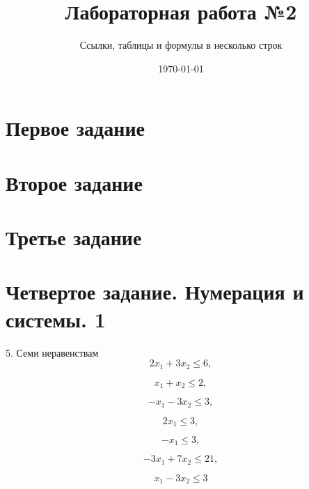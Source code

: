 \documentclass[a4paper,12pt]{article} %
\author{Ссылки, таблицы и формулы в несколько строк}
\title{Лабораторная работа №2}
\date{\today}
\begin{document}
	
	\maketitle %
	
	
	
	
	
	\section{Первое задание}
	
	\section{Второе задание}
	
	\section{Третье задание}

	\section{Четвертое задание. Нумерация и системы. 1}
	5. Семи неравенствам
	\begin{equation}
		2x_1 + 3x_2 \leqslant 6,
	\end{equation}

	\begin{equation}
		x_1 + x_2 \leqslant 2, 
	\end{equation}

	\begin{equation}
		-x_1 - 3x_2 \leqslant 3,		
	\end{equation}

	\begin{equation}
		2x_1 \leqslant 3,		
	\end{equation}

	\begin{equation}
		-x_1 \leqslant 3,
	\end{equation}

	\begin{equation}
		-3x_1 + 7x_2 \leqslant 21,		
	\end{equation}

	\begin{equation}
		x_1 - 3x_2 \leqslant 3		
	\end{equation}
\end{document}
